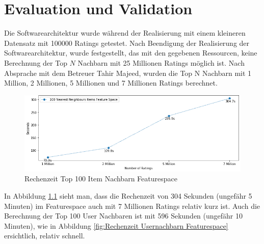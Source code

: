 \chapter{Evaluation und Validation}
\label{ch:Eval}

Die  Softwarearchitektur wurde während der Realisierung mit einem kleineren Datensatz mit 100000 Ratings getestet. Nach Beendigung der Realisierung der Softwarearchitektur, wurde festgestellt, das mit den gegebenen Ressourcen, keine Berechnung der Top $N$ Nachbarn mit 25 Millionen Ratings möglich ist.
Nach Absprache mit dem Betreuer Tahir Majeed, wurden die Top N Nachbarn mit 1 Million, 2 Millionen, 5 Millionen und 7 Millionen Ratings berechnet. 

\begin{figure}[htb]
	\centering
	\includegraphics[keepaspectratio,width=\linewidth]{img/Time to Compute Items Featurespace.png}
	\caption{Rechenzeit Top 100 Item Nachbarn Featurespace}
	\label{fig:Rechenzeit Itemnachbarn Featurespace}
\end{figure}

In Abbildung \ref{fig:Rechenzeit Itemnachbarn Featurespace} sieht man, dass die Rechenzeit von 304 Sekunden (ungefähr 5 Minuten) im Featurespace auch mit 7 Millionen Ratings relativ kurz ist. Auch die Berechnung der Top 100 User Nachbaren ist mit 596 Sekunden (ungefähr 10 Minuten), wie in Abbildung \ref{fig:Rechenzeit Usernachbarn Featurespace} ersichtlich, relativ schnell. 

